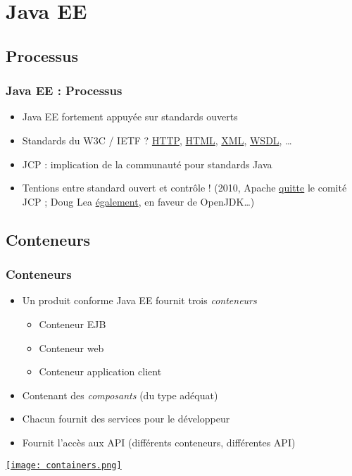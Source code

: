 \documentclass[english, french]{beamer}
\begin{document}
\section{Java EE}
\subsection{Processus}
\begin{frame}
	\frametitle{Java EE : Processus}
	\begin{itemize}
		\item Java EE fortement appuyée sur standards ouverts
		\item Standards du W3C / IETF ?\pause{} \href{http://www.w3.org/Protocols/}{HTTP}, \href{http://www.w3.org/html/}{HTML}, \href{http://www.w3.org/XML/}{XML}, \href{http://www.w3.org/TR/wsdl}{WSDL}, …\pause
		\item JCP : implication de \og{}la communauté\fg{} pour standards Java
		\item Tentions entre standard ouvert et contrôle ! (2010, Apache \href{https://blogs.apache.org/foundation/entry/the_asf_resigns_from_the}{quitte} le comité JCP ; Doug Lea \href{http://gee.cs.oswego.edu/dl/html/jcp22oct10.html}{également}, en faveur de OpenJDK…)
	\end{itemize}
\end{frame}

\subsection{Conteneurs}
\begin{frame}
	\frametitle{Conteneurs}
	\begin{itemize}
		\item Un produit conforme Java EE fournit trois \emph{conteneurs}
		\begin{itemize}
			\item Conteneur EJB
			\item Conteneur web
			\item Conteneur application client
		\end{itemize}
		\item Contenant des \emph{composants} (du type adéquat)
		\item Chacun fournit des services pour le développeur
		\item Fournit l’accès aux API (différents conteneurs, différentes API)
	\end{itemize}
	\href{https://docs.oracle.com/javaee/7/tutorial/overview007.htm}{\texttt{[image: containers.png]}}
\end{frame}
\end{document}
